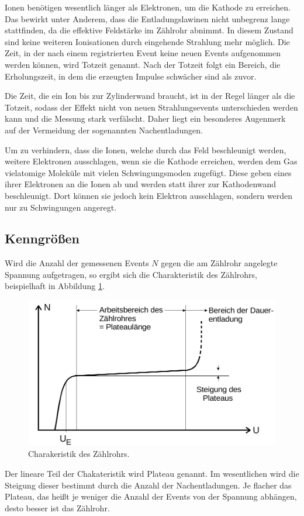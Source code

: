 Ionen benötigen wesentlich länger als Elektronen, um die Kathode zu erreichen.
Das bewirkt unter Anderem, dass die Entladungslawinen nicht unbegrenz lange stattfinden, da die effektive Feldstärke
im Zählrohr abnimmt.
In diesem Zustand sind keine weiteren Ionisationen durch eingehende Strahlung mehr möglich.
Die Zeit, in der nach einem registrierten Event keine neuen Events aufgenommen werden können, wird Totzeit genannt.
Nach der Totzeit folgt ein Bereich, die Erholungszeit, in dem die erzeugten Impulse schwächer sind als zuvor.

Die Zeit, die ein Ion bis zur Zylinderwand braucht, ist in der Regel länger als die Totzeit, sodass der Effekt nicht von neuen
Strahlungsevents unterschieden werden kann und die Messung stark verfälscht.
Daher liegt ein besonderes Augenmerk auf der Vermeidung der sogenannten Nachentladungen.

Um zu verhindern, dass die Ionen, welche durch das Feld beschleunigt werden, weitere Elektronen ausschlagen,
wenn sie die Kathode erreichen, werden dem Gas vielatomige Moleküle mit vielen Schwingungsmoden zugefügt. Diese geben eines ihrer Elektronen an die Ionen ab
und werden statt ihrer zur Kathodenwand beschleunigt.
Dort können sie jedoch kein Elektron ausschlagen, sondern werden nur zu Schwingungen angeregt.

\subsection{Kenngrößen}
Wird die Anzahl der gemessenen Events $N$ gegen die am Zählrohr angelegte Spannung aufgetragen, so ergibt sich die Charakteristik
des Zählrohrs, beispielhaft in Abbildung \ref{fig:plateau}.
\begin{figure}[H]
  \centering
  \includegraphics[width=\textwidth]{content/plateau.png}
  \caption{Charakeristik des Zählrohrs.\cite{v703}}
  \label{fig:plateau}
\end{figure}
Der lineare Teil der Chakateristik wird Plateau genannt.
Im wesentlichen wird die Steigung dieser bestimmt durch die Anzahl der Nachentladungen.
Je flacher das Plateau, das heißt je weniger die Anzahl der Events von der Spannung abhängen, desto besser ist das Zählrohr.

